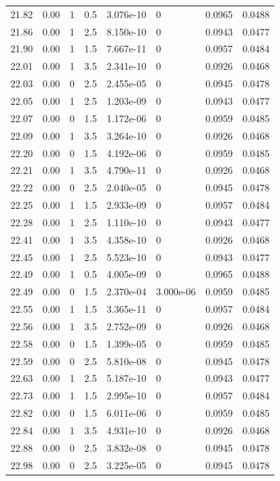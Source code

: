 \documentclass[preview]{standalone}
\begin{document}
{{{{{{{{{{\begin{tabular}{L{1.2cm}C{1.2cm} C{0.3cm}C{0.5cm} C{1.4cm}C{1.4cm} C{1.4cm}C{1.4cm}}
  21.82  &  0.00  & 1     & 0.5 &  3.076e-10  & 0  & 0.0965 &  0.0488   \\ 
  21.86  &  0.00  & 1     & 2.5 &  8.150e-10  & 0  & 0.0943 &  0.0477   \\ 
  21.90  &  0.00  & 1     & 1.5 &  7.667e-11  & 0  & 0.0957 &  0.0484   \\ 
  22.01  &  0.00  & 1     & 3.5 &  2.341e-10  & 0  & 0.0926 &  0.0468   \\ 
  22.03  &  0.00  & 0     & 2.5 &  2.455e-05  & 0  & 0.0945 &  0.0478   \\ 
  22.05  &  0.00  & 1     & 2.5 &  1.203e-09  & 0  & 0.0943 &  0.0477   \\ 
  22.07  &  0.00  & 0     & 1.5 &  1.172e-06  & 0  & 0.0959 &  0.0485   \\ 
  22.09  &  0.00  & 1     & 3.5 &  3.264e-10  & 0  & 0.0926 &  0.0468   \\ 
  22.20  &  0.00  & 0     & 1.5 &  4.192e-06  & 0  & 0.0959 &  0.0485   \\ 
  22.21  &  0.00  & 1     & 3.5 &  4.790e-11  & 0  & 0.0926 &  0.0468   \\ 
  22.22  &  0.00  & 0     & 2.5 &  2.040e-05  & 0  & 0.0945 &  0.0478   \\ 
  22.25  &  0.00  & 1     & 1.5 &  2.933e-09  & 0  & 0.0957 &  0.0484   \\ 
  22.28  &  0.00  & 1     & 2.5 &  1.110e-10  & 0  & 0.0943 &  0.0477   \\ 
  22.41  &  0.00  & 1     & 3.5 &  4.358e-10  & 0  & 0.0926 &  0.0468   \\ 
  22.45  &  0.00  & 1     & 2.5 &  5.523e-10  & 0  & 0.0943 &  0.0477   \\ 
  22.49  &  0.00  & 1     & 0.5 &  4.005e-09  & 0  & 0.0965 &  0.0488   \\ 
  22.49  &  0.00  & 0     & 1.5 &  2.370e-04  & 3.000e-06  & 0.0959 &  0.0485   \\ 
  22.55  &  0.00  & 1     & 1.5 &  3.365e-11  & 0  & 0.0957 &  0.0484   \\ 
  22.56  &  0.00  & 1     & 3.5 &  2.752e-09  & 0  & 0.0926 &  0.0468   \\ 
  22.58  &  0.00  & 0     & 1.5 &  1.399e-05  & 0  & 0.0959 &  0.0485   \\ 
  22.59  &  0.00  & 0     & 2.5 &  5.810e-08  & 0  & 0.0945 &  0.0478   \\ 
  22.63  &  0.00  & 1     & 2.5 &  5.187e-10  & 0  & 0.0943 &  0.0477   \\ 
  22.73  &  0.00  & 1     & 1.5 &  2.995e-10  & 0  & 0.0957 &  0.0484   \\ 
  22.82  &  0.00  & 0     & 1.5 &  6.011e-06  & 0  & 0.0959 &  0.0485   \\ 
  22.84  &  0.00  & 1     & 3.5 &  4.931e-10  & 0  & 0.0926 &  0.0468   \\ 
  22.88  &  0.00  & 0     & 2.5 &  3.832e-08  & 0  & 0.0945 &  0.0478   \\ 
  22.98  &  0.00  & 0     & 2.5 &  3.225e-05  & 0  & 0.0945 &  0.0478   \\ 
\hline 
\end{tabular} 

}}}}}}}}}}
\end{document}

